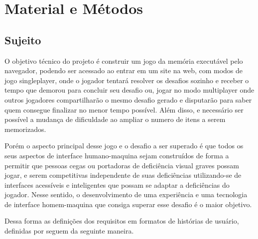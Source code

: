 \chapter{Material e Métodos}

\label{chap:Material e Métodos}

\section{Sujeito}
O objetivo técnico do projeto é construir um jogo da memória executável pelo navegador, podendo ser acessado ao entrar em um site na web, com modos de jogo singleplayer, onde o jogador tentará resolver os desafios sozinho e receber o tempo que demorou para concluir seu desafio ou, jogar no modo multiplayer onde outros jogadores compartilharão o mesmo desafio gerado e disputarão para saber quem consegue finalizar no menor tempo possível. Além disso, e necessário ser possível a mudança de dificuldade ao ampliar o numero de itens a serem memorizados.

Porém o aspecto principal desse jogo e o desafio a ser superado é que todos os seus aspectos de interface humano-maquina sejam construídos de forma a permitir que pessoas cegas ou portadoras de deficiência visual graves possam jogar, e serem competitivas independente de suas deficiências utilizando-se de interfaces acessíveis e inteligentes que possam se adaptar a deficiências do jogador. Nesse sentido, o desenvolvimento de uma experiência e uma tecnologia de interface homem-maquina que consiga superar esse desafio é o maior objetivo.

Dessa forma as definições dos requisitos em formatos de histórias de usuário, definidas por \cite{extremprogramming} seguem da seguinte maneira.

